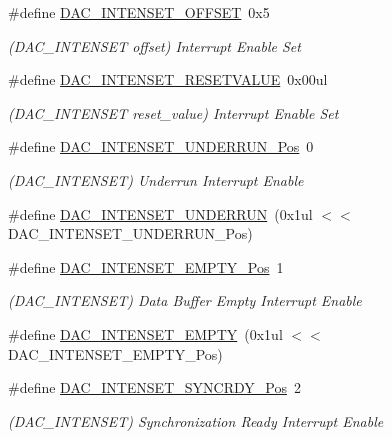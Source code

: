 \begin{DoxyCompactItemize}
\#define \mbox{\hyperlink{group___s_a_m_d21___d_a_c_ga0ccf063ca605c99a4d7675883da90a35}{D\+A\+C\+\_\+\+I\+N\+T\+E\+N\+S\+E\+T\+\_\+\+O\+F\+F\+S\+ET}}~0x5
\begin{DoxyCompactList}\small\item\em (D\+A\+C\+\_\+\+I\+N\+T\+E\+N\+S\+ET offset) Interrupt Enable Set \end{DoxyCompactList}\item 
\#define \mbox{\hyperlink{group___s_a_m_d21___d_a_c_gac03fead9c4f7f214a3e9c0718a629b84}{D\+A\+C\+\_\+\+I\+N\+T\+E\+N\+S\+E\+T\+\_\+\+R\+E\+S\+E\+T\+V\+A\+L\+UE}}~0x00ul
\begin{DoxyCompactList}\small\item\em (D\+A\+C\+\_\+\+I\+N\+T\+E\+N\+S\+ET reset\+\_\+value) Interrupt Enable Set \end{DoxyCompactList}\item 
\#define \mbox{\hyperlink{group___s_a_m_d21___d_a_c_ga38aa2d8302976875d983b1e2c6b0ced2}{D\+A\+C\+\_\+\+I\+N\+T\+E\+N\+S\+E\+T\+\_\+\+U\+N\+D\+E\+R\+R\+U\+N\+\_\+\+Pos}}~0
\begin{DoxyCompactList}\small\item\em (D\+A\+C\+\_\+\+I\+N\+T\+E\+N\+S\+ET) Underrun Interrupt Enable \end{DoxyCompactList}\item 
\#define \mbox{\hyperlink{group___s_a_m_d21___d_a_c_ga1f6ced1ae61e442654cc75b4990a3db1}{D\+A\+C\+\_\+\+I\+N\+T\+E\+N\+S\+E\+T\+\_\+\+U\+N\+D\+E\+R\+R\+UN}}~(0x1ul $<$$<$ D\+A\+C\+\_\+\+I\+N\+T\+E\+N\+S\+E\+T\+\_\+\+U\+N\+D\+E\+R\+R\+U\+N\+\_\+\+Pos)
\item 
\#define \mbox{\hyperlink{group___s_a_m_d21___d_a_c_ga12375d6d098ab02a3889530b60730fc4}{D\+A\+C\+\_\+\+I\+N\+T\+E\+N\+S\+E\+T\+\_\+\+E\+M\+P\+T\+Y\+\_\+\+Pos}}~1
\begin{DoxyCompactList}\small\item\em (D\+A\+C\+\_\+\+I\+N\+T\+E\+N\+S\+ET) Data Buffer Empty Interrupt Enable \end{DoxyCompactList}\item 
\#define \mbox{\hyperlink{group___s_a_m_d21___d_a_c_gae0ba55a3795921a328b29e2b2b4c4455}{D\+A\+C\+\_\+\+I\+N\+T\+E\+N\+S\+E\+T\+\_\+\+E\+M\+P\+TY}}~(0x1ul $<$$<$ D\+A\+C\+\_\+\+I\+N\+T\+E\+N\+S\+E\+T\+\_\+\+E\+M\+P\+T\+Y\+\_\+\+Pos)
\item 
\#define \mbox{\hyperlink{group___s_a_m_d21___d_a_c_ga3036a73dc494322c684c9236bd70454f}{D\+A\+C\+\_\+\+I\+N\+T\+E\+N\+S\+E\+T\+\_\+\+S\+Y\+N\+C\+R\+D\+Y\+\_\+\+Pos}}~2
\begin{DoxyCompactList}\small\item\em (D\+A\+C\+\_\+\+I\+N\+T\+E\+N\+S\+ET) Synchronization Ready Interrupt Enable \end{DoxyCompactList}\item 

\end{DoxyCompactItemize}
